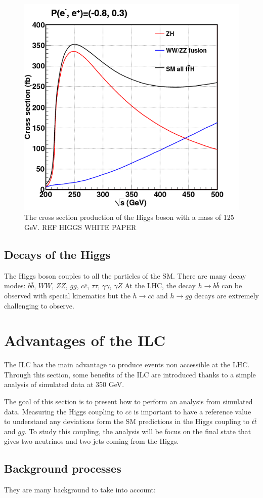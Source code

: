   \begin{figure}
    \centering
    \includegraphics[width = 10 cm]{Pictures/Higgs/higgs_xsec_P-8_3.png}
    \caption{The cross section production of the Higgs boson with a mass of 125 GeV. REF HIGGS WHITE PAPER}
    \label{fig:higgsXsec}
  \end{figure}

  \subsection{Decays of the Higgs}

  The Higgs boson couples to all the particles of the SM.
  There are many decay modes: $b\overline{b}$, $WW$, $ZZ$, $gg$, $c\overline{c}$, $\tau \tau$, $\gamma \gamma$, $\gamma Z$
  At the LHC, the decay $h \rightarrow b\overline{b}$ can be observed with special kinematics but the $h \rightarrow c \overline{c}$ and $h \rightarrow gg$ decays are extremely challenging to observe.


  \section{Advantages of the ILC}

  The \gls{ILC} has the main advantage to produce events non accessible at the \gls{LHC}.
  Through this section, some benefits of the \gls{ILC} are introduced thanks to a simple analysis of simulated data at 350 GeV.
  
  The goal of this section is to present how to perform an analysis from simulated data. 
  Measuring the Higgs coupling to $c\overline{c}$ is important to have a reference value to understand any deviations form the SM predictions in the Higgs coupling to $t\overline{t}$ and $gg$.
  To study this coupling, the analysis will be focus on the final state that gives two neutrinos and two jets coming from the Higgs.
  
  \subsection{Background processes}

  They are many background to take into account:    
